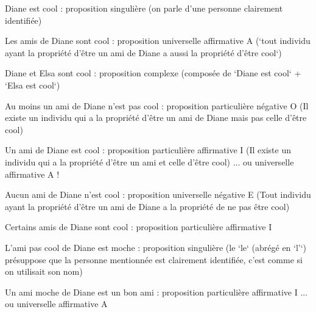 \begin{frame}

Diane est cool : \pause proposition singulière (on parle d'une personne clairement identifiée)\pause\newline

Les amis de Diane sont cool : \pause proposition universelle affirmative A (`tout individu ayant la propriété d'être un ami de Diane a aussi la propriété d'être cool`)\pause\newline

Diane et Elsa sont cool : \pause proposition complexe (composée de `Diane est cool` + `Elsa est cool`)\pause\newline

Au moins un ami de Diane n'est pas cool : \pause proposition particulière négative O (Il existe un individu qui a la propriété d'être un ami de Diane mais pas celle d'être cool)

\end{frame}
\begin{frame}

Un ami de Diane est cool : \pause proposition particulière affirmative I (Il existe un individu qui a la propriété d'être un ami et celle d'être cool) \pause ... ou universelle affirmative A !\newline\pause

Aucun ami de Diane n'est cool : \pause proposition universelle négative E (Tout individu ayant la propriété d'être un ami de Diane a la propriété de ne pas être cool)\pause\newline

Certains amis de Diane sont cool : \pause proposition particulière affirmative I

\end{frame}
\begin{frame}

L'ami pas cool de Diane est moche : \pause proposition singulière \pause (le `le` (abrégé en `l'`) présuppose que la personne mentionnée est clairement identifiée, c'est comme si on utilisait son nom)\pause\newline

Un ami moche de Diane est un bon ami : \pause proposition particulière affirmative I \pause ... ou universelle affirmative A
\end{frame}


